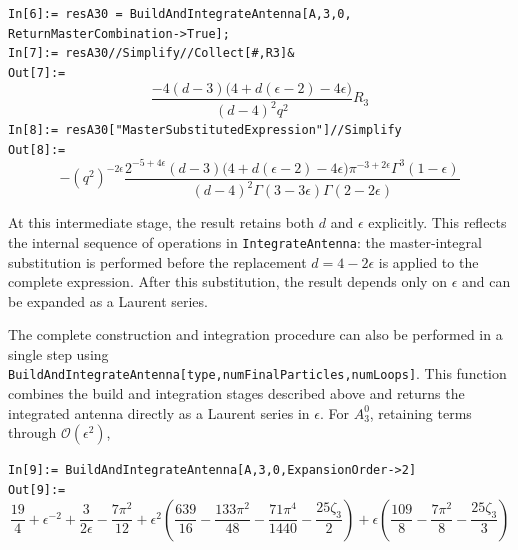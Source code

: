 \begin{mdframed}[backgroundcolor=gray!10, linewidth=0pt]
    \texttt{In[6]:= resA30 = BuildAndIntegrateAntenna[A,3,0,\\ReturnMasterCombination->True];}\\
    \hfill
    \texttt{In[7]:= resA30//Simplify//Collect[\#,R3]\&}\\
    \hfill
    \texttt{Out[7]:=}
        \begin{equation*}
            \frac{-4(d-3)\big(4+d(\epsilon-2)-4\epsilon\big)}{(d-4)^2q^2}R_3
        \end{equation*}
    \texttt{In[8]:= resA30["MasterSubstitutedExpression"]//Simplify}\\
    \hfill
    \texttt{Out[8]:=}
        \begin{equation*}
            -\left(q^2\right)^{-2\epsilon}\frac{2^{-5+4\epsilon}(d-3)\big(4+d(\epsilon-2)-4\epsilon\big)\pi^{-3+2\epsilon}\Gamma^3(1-\epsilon)}{(d-4)^2\Gamma(3-3\epsilon)\Gamma(2-2\epsilon)}
        \end{equation*}
\end{mdframed}

At this intermediate stage, the result retains both $d$ and $\epsilon$ explicitly. This reflects the
internal sequence of operations in \texttt{IntegrateAntenna}: the master-integral substitution is
performed before the replacement $d=4-2\epsilon$ is applied to the complete expression. After this
substitution, the result depends only on $\epsilon$ and can be expanded as a Laurent series.

The complete construction and integration procedure can also be performed in a single step using
\texttt{BuildAndIntegrateAntenna[type,numFinalParticles,numLoops]}. This function combines the build
and integration stages described above and returns the integrated antenna directly as a Laurent
series in $\epsilon$. For $A_3^0$, retaining terms through $\mathcal O(\epsilon^2)$,

\begin{mdframed}[backgroundcolor=gray!10, linewidth=0pt]
    \texttt{In[9]:= BuildAndIntegrateAntenna[A,3,0,ExpansionOrder->2]}\\
    \hfill
    \texttt{Out[9]:=}
        \begin{equation*}
            \frac{19}{4}+\epsilon^{-2}+\frac3{2\epsilon}-\frac{7\pi^2}{12}+\epsilon^2\left(\frac{639}{16}-\frac{133\pi^2}{48}-\frac{71\pi^4}{1440}-\frac{25\zeta_3}{2}\right)+\epsilon\left(\frac{109}{8}-\frac{7\pi^2}{8}-\frac{25\zeta_3}{3}\right)
        \end{equation*}
\end{mdframed}

